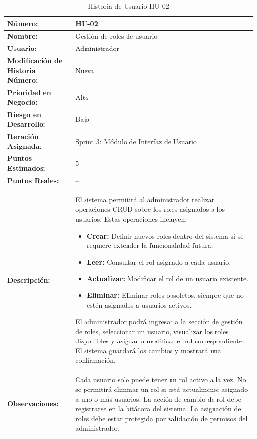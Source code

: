 \begin{table}[h]
	\centering
	\caption{Historia de Usuario HU-02}
	\begin{tabular}{|p{5cm}|p{9cm}|}
		\hline
		\textbf{Número:}                          & HU-02                                   \\ \hline
		\textbf{Nombre:}                          & Gestión de roles de usuario             \\ \hline
		\textbf{Usuario:}                         & Administrador                           \\ \hline
		\textbf{Modificación de Historia Número:} & Nueva                                   \\ \hline
		\textbf{Prioridad en Negocio:}            & Alta                                    \\ \hline
		\textbf{Riesgo en Desarrollo:}            & Bajo                                    \\ \hline
		\textbf{Iteración Asignada:}              & Sprint 3: Módulo de Interfaz de Usuario \\ \hline
		\textbf{Puntos Estimados:}                & 5                                       \\ \hline
		\textbf{Puntos Reales:}                   & --                                      \\ \hline
		\textbf{Descripción:}                     &
		El sistema permitirá al administrador realizar operaciones CRUD sobre los roles asignados a los usuarios. Estas operaciones incluyen:
		\begin{itemize}
			\item \textbf{Crear:} Definir nuevos roles dentro del sistema si se requiere extender la funcionalidad futura.
			\item \textbf{Leer:} Consultar el rol asignado a cada usuario.
			\item \textbf{Actualizar:} Modificar el rol de un usuario existente.
			\item \textbf{Eliminar:} Eliminar roles obsoletos, siempre que no estén asignados a usuarios activos.
		\end{itemize}
		El administrador podrá ingresar a la sección de gestión de roles, seleccionar un usuario, visualizar los roles disponibles y asignar o modificar el rol correspondiente. El sistema guardará los cambios y mostrará una confirmación.
		\\ \hline
		\textbf{Observaciones:}                   &
		Cada usuario solo puede tener un rol activo a la vez.
		No se permitirá eliminar un rol si está actualmente asignado a uno o más usuarios.
		La acción de cambio de rol debe registrarse en la bitácora del sistema.
		La asignación de roles debe estar protegida por validación de permisos del administrador.
		\\ \hline
	\end{tabular}
\end{table}


